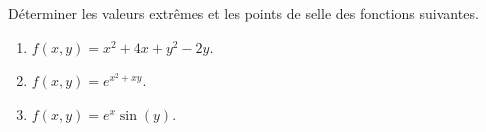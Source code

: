 
\begin{exercice}\label{exoFoncDeuxVar0028}

	Déterminer les valeurs extrêmes et les points de selle des fonctions suivantes.
	\begin{multicols}{2}
		\begin{enumerate}
			\item	%
				$f(x,y)=x^2+4x+y^2-2y$.
			\item	%
				$f(x,y)= e^{x^2+xy}$.
			\item	%
				$f(x,y)=e^x\sin(y)$.
		\end{enumerate}
	\end{multicols}

\end{exercice}
